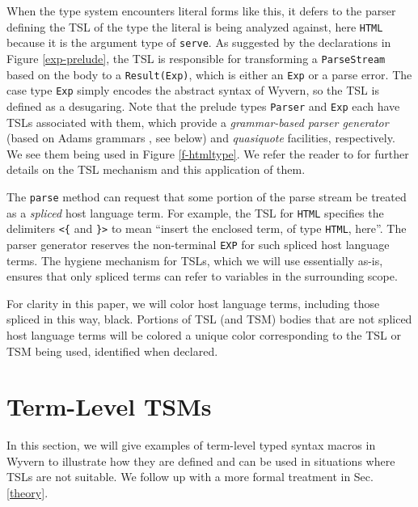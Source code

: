 \documentclass{sig-alternate}
\begin{document}
When the type system encounters literal forms like this, it defers to the parser defining the TSL of the type the literal is being analyzed against, here \verb|HTML| because it is the argument type of \verb|serve|. As suggested by the declarations in Figure \ref{exp-prelude}, the TSL is responsible for transforming a \verb|ParseStream| based on the body to a \verb|Result(Exp)|, which is either an \verb|Exp| or a parse error. The case type \verb|Exp| simply encodes the abstract syntax of Wyvern, so the TSL is defined as a desugaring. Note that the prelude types \verb|Parser| and \verb|Exp| each have TSLs associated with them, which provide a \emph{grammar-based parser generator} (based on Adams grammars \cite{Adams:2013:PPI:2429069.2429129}, see below) and \emph{quasiquote} facilities, respectively. We see them being used in Figure \ref{f-htmltype}. We refer the reader to \cite{TSLs} for further details on the TSL mechanism and this application  of them.

The \verb|parse| method can request that some portion of the parse stream be treated as a \emph{spliced} host language term. For example, the TSL for \verb|HTML| specifies the delimiters \verb|<{| and \verb|}>| to mean ``insert the enclosed term, of type \verb|HTML|, here''. The parser generator reserves the non-terminal \verb|EXP| for such spliced host language terms. The hygiene mechanism for TSLs, which we will use essentially as-is, ensures that only spliced terms can refer to variables in the surrounding scope.

For clarity in this paper, we will color host language terms, including those spliced in this way, black. Portions of TSL (and TSM) bodies that are not spliced host language terms will be colored a unique color corresponding to the TSL or TSM being used, identified when declared. 

\section{Term-Level TSM\lowercase{s}}\label{tsms-term}
In this section, we will give examples of term-level typed syntax macros in Wyvern to illustrate how they are defined and can be used in situations where TSLs are not suitable. We follow up with a more formal treatment in Sec. \ref{theory}. 

\end{document}
